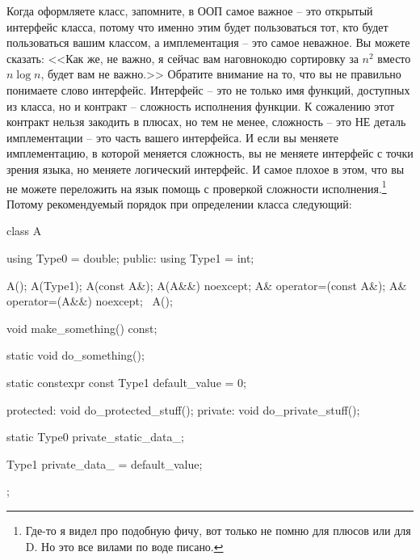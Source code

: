 \documentclass{article}
\begin{document}
Когда оформляете класс, запомните, в ООП самое важное -- это открытый интерфейс класса, потому что именно этим будет пользоваться тот, кто будет пользоваться вашим классом, а имплементация -- это самое неважное. Вы можете сказать: <<Как же, не важно, я сейчас вам наговнокодю сортировку за $n^2$ вместо $n\log n$, будет вам не важно.>> Обратите внимание на то, что вы не правильно понимаете слово интерфейс. Интерфейс -- это не только имя функций, доступных из класса, но и контракт -- сложность исполнения функции. К сожалению этот контракт нельзя закодить в плюсах, но тем не менее, сложность -- это НЕ деталь имплементации -- это часть вашего интерфейса. И если вы меняете имплементацию, в которой меняется сложность, вы не меняете интерфейс с точки зрения языка, но меняете логический интерфейс. И самое плохое в этом, что вы не можете переложить на язык помощь с проверкой сложности исполнения.\footnote{Где-то я видел про подобную фичу, вот только не помню для плюсов или для D. Но это все вилами по воде писано.} Потому рекомендуемый порядок при определении класса следующий:
\begin{cppcode}
class A {
  using Type0 = double;
public:
  using Type1 = int;

  A();
  A(Type1);
  A(const A&);
  A(A&&) noexcept;
  A& operator=(const A&);
  A& operator=(A&&) noexcept;
  ~A();
  
  void make_something() const;
  
  static  void do_something();
  
  static constexpr const Type1 default_value = 0;

protected:
  void do_protected_stuff();
private:
  void do_private_stuff();

  static Type0 private_static_data_;
  
  Type1 private_data_ = default_value;
};
\end{cppcode}
\end{document}
